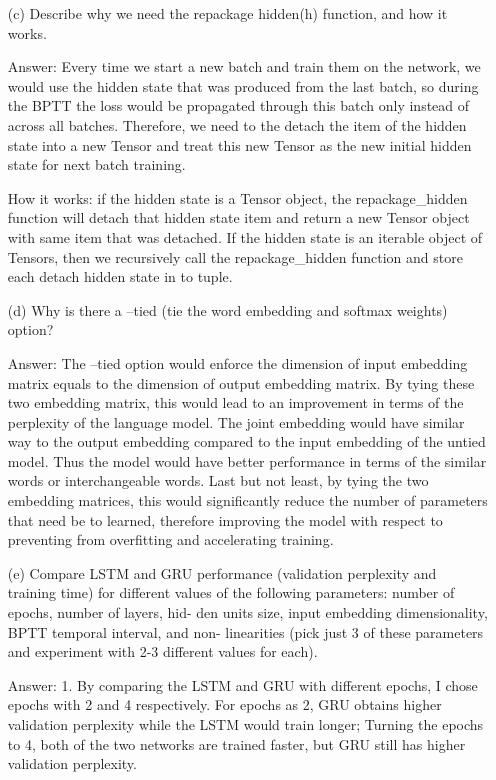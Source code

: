 \documentclass[12pt,letterpaper]{article}
\begin{document}
\begin{itemize}
    \item[(c)]Describe why we need the repackage hidden(h) function, and how it works.
    
    Answer: Every time we start a new batch and train them on the network, we would use the hidden state that was produced from the last batch, so during the BPTT the loss would be propagated through this batch only instead of across all batches. Therefore, we need to the detach the item of the hidden state into a new Tensor and treat this new Tensor as the new initial hidden state for next batch training.
    
    How it works: if the hidden state is a Tensor object, the repackage\_hidden function will detach that hidden state item and return a new Tensor object with same item that was detached. If the hidden state is an iterable object of Tensors, then we recursively call the repackage\_hidden function and store each detach hidden state in to tuple.
    
    \item[(d)]Why is there a --tied (tie the word embedding and softmax weights) option?
    
    Answer: The --tied option would enforce the dimension of input embedding matrix equals to the dimension of output embedding matrix. By tying these two embedding matrix, this would lead to an improvement in terms of the perplexity of the language model. The joint embedding would have similar way to the output embedding compared to the input embedding of the untied model. Thus the model would have better performance in terms of the similar words or interchangeable words. Last but not least, by tying the two embedding matrices, this would significantly reduce the number of parameters that need be to learned, therefore improving the model with respect to preventing from overfitting and accelerating training.
    
    \item[(e)]Compare LSTM and GRU performance (validation perplexity and training time) for different values of the following parameters: number of epochs, number of layers, hid- den units size, input embedding dimensionality, BPTT temporal interval, and non- linearities (pick just 3 of these parameters and experiment with 2-3 different values for each).
    
    Answer: 
    1. By comparing the LSTM and GRU with different epochs, I chose epochs with 2 and 4 respectively. For epochs as 2, GRU obtains higher validation perplexity while the LSTM would train longer; Turning the epochs to 4, both of the two networks are trained faster, but GRU still has higher validation perplexity.
    

\end{itemize}
\end{document}
